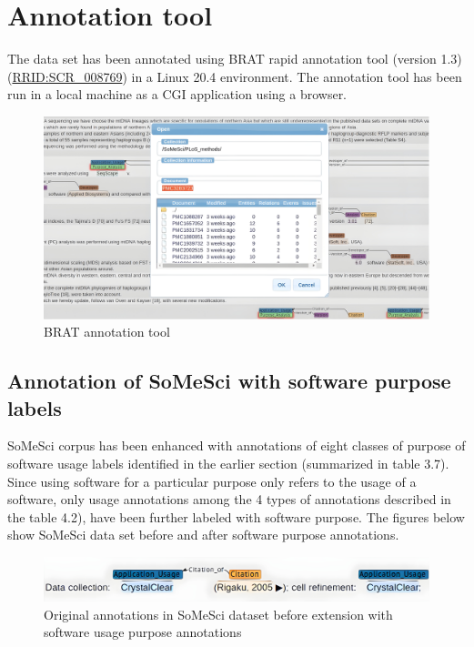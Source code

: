 \section{Annotation tool}
\label{sec:dataset:tool}
The data set has been annotated using BRAT rapid annotation tool (version 1.3) (\href{https://scicrunch.org/resolver/SCR_008769}{RRID:SCR\_008769})  in a Linux 20.4 environment. The annotation tool has been run in a local machine as a \ac{CGI} application using a browser. 

\begin{figure}[htbp]
	\centering
	\includegraphics[width=.66\textwidth]{4.graphics/figures/ch_4/BRAT_tool}
	\caption{BRAT annotation tool}
	\label{fig:chapter04:setup}
\end{figure}

\subsection{Annotation of SoMeSci with software purpose labels}
\label{subsec:dataset:tool:Annotationprocess}

\ac{SoMeSci} corpus has been enhanced with annotations of eight classes of purpose of software usage labels  identified in the earlier section (summarized in table 3.7). Since using software for a particular purpose only refers to the usage of a software, only usage annotations among the 4 types of annotations described in the table 4.2), have been further labeled with software purpose. The figures below show \ac{SoMeSci} data set before and after software purpose annotations. \\

\begin{figure}[htbp]
	\centering
	\includegraphics[width=.85\textwidth]{4.graphics/figures/ch_4/before_ann_hd_PMC3120364_FULLTEX_HD}
	\caption{Original annotations in \ac{SoMeSci} dataset before extension with software usage purpose annotations }
	\label{fig:chapter04:setup}
\end{figure}

